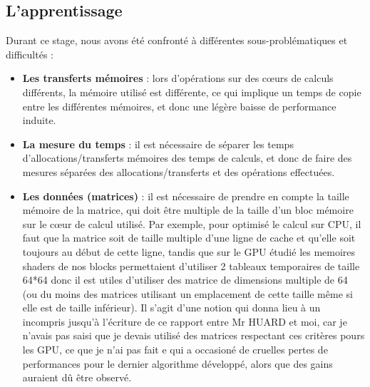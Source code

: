 \documentclass[a4paper,12pt]{article}
\begin{document}
{{	\subsection{L'apprentissage}
	\indent Durant ce stage, nous avons \'e{}t\'e confront\'e \`a diff\'e{}rentes sous-probl\'e{}matiques et difficult\'e{}s :
	\begin{itemize}
	    \item \textbf{Les transferts m\'e{}moires} : lors d'opérations sur des c\oe{}urs de calculs diff\'e{}rents, la m\'e{}moire utilis\'e est diff\'e{}rente, ce qui implique un temps de copie entre les diff\'e{}rentes m\'e{}moires, et donc une l\'e{}g\`ere baisse de performance induite.
	    \item \textbf{La mesure du temps} : il est n\'e{}cessaire de s\'e{}parer les temps d'allocations/transferts m\'e{}moires des temps de calculs, et donc de faire des mesures s\'e{}par\'e{}es des allocations/transferts et des opérations effectu\'e{}es.
	    \item \textbf{Les donn\'e{}es (matrices)} : il est n\'e{}cessaire de prendre en compte la taille m\'e{}moire de la matrice, qui doit être multiple de la taille d'un bloc m\'e{}moire sur le c\oe{}ur de calcul utilis\'e. Par exemple, pour optimis\'e{} le calcul sur CPU, il faut que la matrice soit de taille multiple d'une ligne de cache et qu'elle soit toujours au d\'e{}but de cette ligne, tandis que sur le GPU \'e{}tudi\'e{} les memoires shaders de nos blocks permettaient d'utiliser 2 tableaux temporaires de taille 64*64 donc il est utiles d'utiliser des matrice de dimensions multiple de 64 (ou du moins des matrices utilisant un emplacement de cette taille m\^eme si elle est de taille inf\'e{}rieur). Il s'agit d'une notion qui donna lieu \`a un incompris jusqu'\`a l'\'e{}criture de ce rapport entre Mr HUARD et moi, car je n'avais pas saisi que je devais utilis\'e des matrices respectant ces crit\`eres pours les GPU, ce que je n'ai pas fait e qui a occasion\'e de cruelles pertes de performances pour le dernier algorithme d\'e{}velopp\'e{}, alors que des gains auraient d\^u \^etre observ\'e{}.
	\end{itemize}
	\newpage
}}
\end{document}
